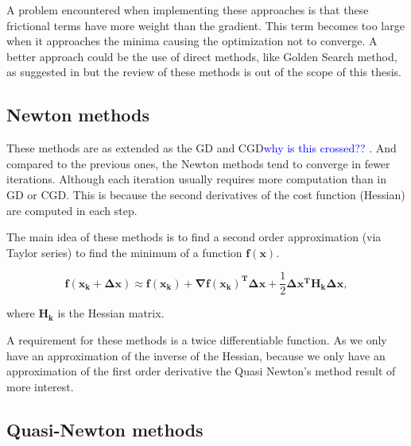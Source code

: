 
A problem encountered when implementing these approaches is that these frictional terms have more weight than the gradient. This term becomes too large when it approaches the minima causing the optimization not to converge. A better approach could be the use of direct methods, like Golden Search method, as suggested in \cite{CGD_converge} but the review of these methods is out of the scope of this thesis.











\subsection{Newton methods}
\label{subsec:newton}

These methods are as extended as the GD and CGD\textcolor{blue}{why is this crossed?? }. And compared to the previous ones, the Newton methods tend to converge in fewer iterations. Although each iteration usually requires more computation than  in GD or CGD. This is because the second derivatives of the cost function (Hessian) are computed in each step. 

The main idea of these methods is to find a second order approximation (via Taylor series) to find the minimum of a function $\mathbf{f(x)}$.


\begin{equation}
\mathbf{f(x_k + \Delta x) }\approx \mathbf{f(x_k) } + \mathbf{\nabla f(x_k)^{T} }\mathbf{\Delta x} + \frac{1}{2} \mathbf{\Delta x^{T} }\mathbf{H_k} \mathbf{\Delta x},
\end{equation}

where $\mathbf{H_k}$ is the Hessian matrix.
 
A requirement for these methods is a twice differentiable function. 
As we only have an approximation of the inverse of the Hessian, because we only have an approximation of the first order derivative the Quasi Newton's method result of more interest.


\subsection{Quasi-Newton methods}
\label{subsec:quasinewton}

